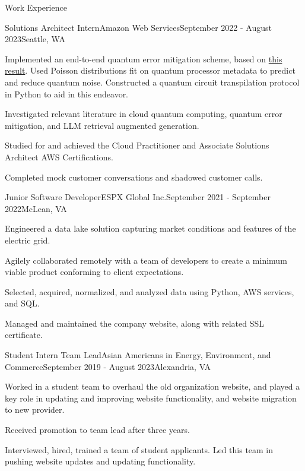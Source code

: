 \documentclass{resume} %
\begin{document}
\begin{rSection}{Work Experience}  
    \begin{rSubsection}{Solutions Architect Intern}{Amazon Web Services}{September 2022 - August 2023}{Seattle, WA}
        \startitems
        \item Implemented an end-to-end quantum error mitigation scheme, based on \href{https://dl.acm.org/doi/abs/10.1145/3579371.3589043}{this result}. Used Poisson distributions fit on quantum processor metadata to predict and reduce quantum noise. Constructed a quantum circuit transpilation protocol in Python to aid in this endeavor. 
        \item Investigated relevant literature in cloud quantum computing, quantum error mitigation, and LLM retrieval augmented generation.
        \item Studied for and achieved the Cloud Practitioner and Associate Solutions Architect AWS Certifications.
        \item Completed mock customer conversations and shadowed customer calls.
    \end{rSubsection}

    \begin{rSubsection}{Junior Software Developer}{ESPX Global Inc.}{September 2021 - September 2022}{McLean, VA}
        \startitems
        \item Engineered a data lake solution capturing market conditions and features of the electric grid.
        \item Agilely collaborated remotely with a team of developers to create a minimum viable product conforming to client expectations.
        \item Selected, acquired, normalized, and analyzed data using Python, AWS services, and SQL.
        \item Managed and maintained the company website, along with related SSL certificate. 
    \end{rSubsection}

      \begin{rSubsection}{Student Intern Team Lead}{Asian Americans in Energy, Environment, and Commerce}{September 2019 - August 2023}{Alexandria, VA}
        \startitems
        \item Worked in a student team to overhaul the old organization website, and played a key role in updating and improving website functionality, and website migration to new provider. 
        \item Received promotion to team lead after three years. 
        \item Interviewed, hired, trained a team of student applicants. Led this team in pushing website updates and updating functionality. 
    \end{rSubsection}
\end{rSection}
\end{document}
